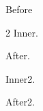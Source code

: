 \documentclass{article}
\begin{document}
Before
\begin{spacing}{2}
Inner.
\end{spacing}
After.
\begin{doublespace}
Inner2.
\end{doublespace}
After2.
\end{document}
